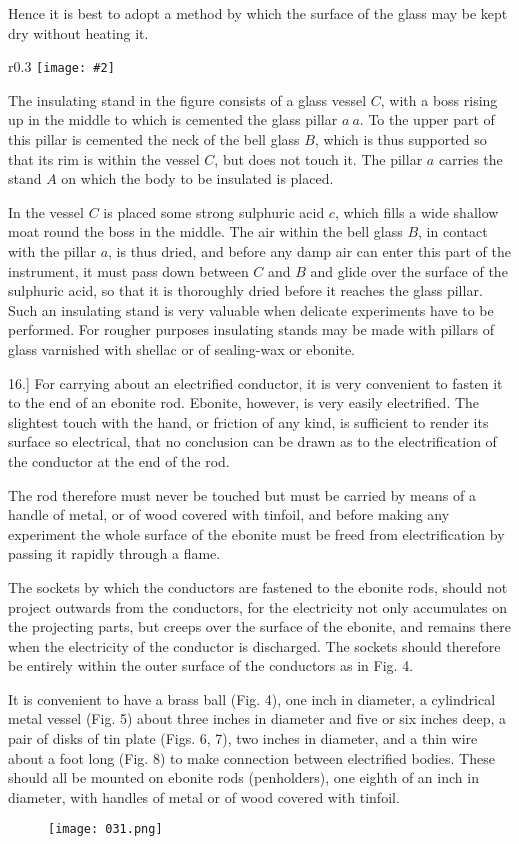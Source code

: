 \documentclass[12pt,oneside]{book}[2021/10/04]
\newcommand{\Runhead}[1]{\fancyhead[C]{\iffloatpage{}{\small#1}}}
\newcommand{\article}[1]{\phantomsection \label{art:#1}{#1.]}}
\newcommand{\wrapfig}[3]{
\begin{wrapfigure}{r}{#1\textwidth}
\centering
\texttt{[image: \#2]}
\caption*{\small #3}
\end{wrapfigure}}
\newcommand{\¬}{\hphantom{0}}
\begin{document}
Hence it is best to adopt a method by which the surface of the
glass may be kept dry without heating it.
\Runhead{INSULATORS.}

\wrapfig{0.3}{030.png}{Fig. 3.}
The insulating stand in the figure consists of a glass vessel \(C\),
with a boss rising up in the middle to which
is cemented the glass pillar \(a~a\). To the upper
part of this pillar is cemented the neck of the
bell glass \(B\), which is thus supported so that
its rim is within the vessel \(C\), but does not
touch it. The pillar \(a\) carries the stand \(A\) on
which the body to be insulated is placed.

In the vessel \(C\) is placed some strong sulphuric
acid \(c\), which fills a wide shallow moat
round the boss in the middle. The air within
the bell glass \(B\), in contact with the pillar \(a\), is
thus dried, and before any damp air can enter
this part of the instrument, it must pass down between \(C\) and \(B\)
and glide over the surface of the sulphuric acid, so that it is
thoroughly dried before it reaches the glass pillar. Such an insulating
stand is very valuable when delicate experiments have to
be performed. For rougher purposes insulating stands may be
made with pillars of glass varnished with shellac or of sealing-wax
or ebonite.

\article{16} For carrying about an electrified conductor, it is very
convenient to fasten it to the end of an ebonite rod. Ebonite,
however, is very easily electrified. The slightest touch with the
hand, or friction of any kind, is sufficient to render its surface so
electrical, that no conclusion can be drawn as to the electrification
of the conductor at the end of the rod.

The rod therefore must never be touched but must be carried
by means of a handle of metal, or of wood covered with tinfoil,
and before making any experiment the whole surface of the ebonite
must be freed from electrification by passing it rapidly through a
flame.

The sockets by which the conductors are fastened to the ebonite
rods, should not project outwards from the conductors, for the
electricity not only accumulates on the projecting parts, but creeps
over the surface of the ebonite, and remains there when the
electricity of the conductor is discharged. The sockets should
therefore be entirely within the outer surface of the conductors
as in Fig. 4.

It is convenient to have a brass ball (Fig. 4), one inch in
diameter, a cylindrical metal vessel (Fig. 5) about three inches
in diameter and five or six inches deep, a pair of disks of tin
plate (Figs. 6, 7), two inches in diameter, and a thin wire about
a foot long (Fig. 8) to make connection between electrified bodies.
These should all be mounted on ebonite rods (penholders), one
eighth of an inch in diameter, with handles of metal or of wood
covered with tinfoil.
\Runhead{APPARATUS.}
\begin{figure}[ht!]
\texttt{[image: 031.png]}
\centering
\end{figure}
\end{document}
